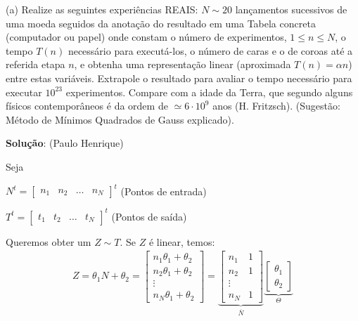 \begin{exercise}

\begin{description}
\item (a) Realize as seguintes experiências REAIS: \(N\sim 20\) lançamentos sucessivos de uma moeda seguidos da anotação do resultado em uma Tabela concreta (computador ou papel) onde constam o número de experimentos, \(1 \le n \le N\), o tempo \(T(n)\) necessário para executá-los, o número de caras e o de coroas até a referida etapa \(n\), e obtenha uma representação linear (aproximada \(T(n) = \alpha n\)) entre estas variáveis. Extrapole o resultado para avaliar o tempo necessário para executar \(10^{23}\) experimentos. Compare com a idade da Terra, que segundo alguns físicos contemporâneos é da ordem de \(\simeq 6 \cdot 10^{9}\) anos (H. Fritzsch). (Sugestão: Método de Mínimos Quadrados de Gauss explicado).

{\color{red}
\textbf{Solução}: (Paulo Henrique)

Seja

\(N^t = \left[\begin{array}{cccc} n_1 & n_2 & \ldots & n_N \end{array}\right]^t\) (Pontos de entrada)

\(T^t = \left[\begin{array}{cccc} t_1 & t_2 & \ldots & t_N\end{array}\right]^t\) (Pontos de saída)

Queremos obter um \(Z \sim T\). Se \(Z\) é linear, temos:
\begin{eqnarray*}
Z
= \theta_1 N + \theta_2
= \left[\begin{array}{c} n_1\theta_1+\theta_2 \\ n_2\theta_1+\theta_2 \\ \vdots \\ n_N\theta_1+\theta_2 \end{array}\right]
= \underbrace{\left[\begin{array}{cc} n_1 & 1 \\ n_2 & 1 \\ \vdots \\ n_N & 1 \end{array}\right]}_{\overline{N}}
\underbrace{\left[\begin{array}{c} \theta_1 \\ \theta_2 \end{array}\right]}_{\Theta}
\end{eqnarray*}

}
\end{description}
\end{exercise}
